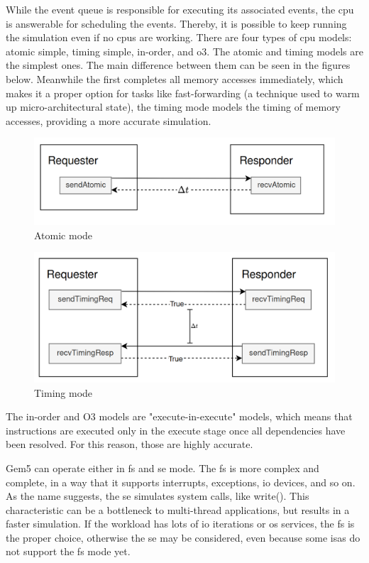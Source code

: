 While the event queue is responsible for executing its associated events, the \gls{cpu} is answerable for scheduling the events. Thereby, it is 
possible to keep running the simulation even if no \glspl{cpu} are working. There are four types of \gls{cpu} models: atomic simple, timing 
simple, in-order, and \gls{o3}. The atomic and timing models are the simplest ones. The main difference between them can be seen in 
the figures below. Meanwhile the first completes all memory accesses immediately, which makes it a proper option for tasks like 
fast-forwarding (a technique used to warm up micro-architectural state), the timing mode models the timing of memory accesses, providing a more 
accurate simulation.

\begin{figure}[H]
	\centering
 	\includegraphics[width=0.7\linewidth]{Images/AtomicMode.png}
 	\caption{Atomic mode}
	 \label{fig_AtomicMode}
\end{figure}

\begin{figure}[H]
	\centering
 	\includegraphics[width=0.7\linewidth]{Images/TimingMode.png}
 	\caption{Timing mode}
	 \label{fig_TimingMode}
\end{figure}

The in-order and O3 models are "execute-in-execute" models, which means that instructions are executed only in the execute stage once all 
dependencies have been resolved. For this reason, those are highly accurate.

Gem5 can operate either in \gls{fs} and \gls{se} mode. The \gls{fs} is more complex and complete, in a way that it supports interrupts, 
exceptions, \gls{io} devices, and so on. As the name suggests, the \gls{se} simulates system calls, like write(). This characteristic can 
be a bottleneck to multi-thread applications, but results in a faster simulation. If the workload has lots of \gls{io} iterations or 
\gls{os} services, the \gls{fs} is the proper choice, otherwise the \gls{se} may be considered, even because some \glspl{isa} do not support 
the \gls{fs} mode yet. 

